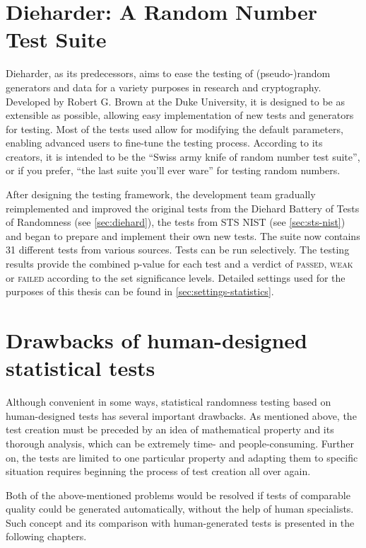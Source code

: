 \documentclass[12pt,oneside]{fithesis2}		%
\renewcommand{\_}{\leavevmode \kern0.0em\vbox{\hrule width0.4em}}
\begin{document}
\section{Dieharder: A Random Number Test Suite}
\label{sec:dieharder}

Dieharder, as its predecessors, aims to ease the testing of (pseudo-)random generators and data for a variety purposes in research 
and cryptography. Developed by Robert G. Brown at the Duke University, it is designed to be as extensible as possible, 
allowing easy implementation of new tests and generators for testing. Most of the tests used allow for 
modifying the default parameters, enabling advanced users to fine-tune the testing process.
According to its creators, it is intended to be the ``Swiss army knife of random number test suite'', 
or if you prefer, ``the last suite you'll ever ware'' for testing random numbers. \parencite{dieharder}

After designing the testing framework, the development team gradually reimplemented and improved the original tests from 
the Diehard Battery of Tests of Randomness (see \autoref{sec:diehard}), 
the tests from STS NIST (see \autoref{sec:sts-nist}) and began to prepare and implement their own new tests.
The suite now contains 31 different tests from various sources. Tests can be run selectively.
The testing results provide the combined p-value for each test and a verdict of \textsc{passed}, \textsc{weak} or \textsc{failed}
according to the set significance levels.
Detailed settings used for the purposes of this thesis can be found in \autoref{sec:settings-statistics}.

\section{Drawbacks of human-designed statistical tests}
\label{sec:limits-stat-testing}

Although convenient in some ways, statistical randomness testing based on human-designed tests has several important drawbacks.
As mentioned above, the test creation must be preceded by an idea of mathematical property and its thorough analysis, 
which can be extremely time- and people-consuming. Further on, the tests are limited to one particular property and
adapting them to specific situation requires beginning the process of test creation all over again.

Both of the above-mentioned problems would be resolved if tests of comparable quality could be generated automatically, without 
the help of human specialists. Such concept and its comparison with human-generated tests is presented in the following chapters.
\end{document}

